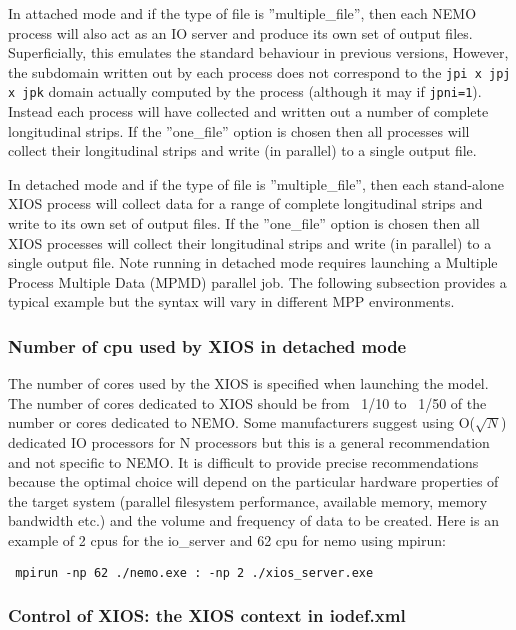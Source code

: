 \documentclass[NEMO_book]{subfiles}
\begin{document}
In attached mode and if the type of file is ''multiple\_file'', then each NEMO process will also act as an IO server and produce its own set of output files. Superficially, this emulates the standard behaviour in previous versions, However, the subdomain written out by each process does not correspond to the {\tt jpi x jpj x jpk} domain actually computed by the process (although it may if {\tt jpni=1}). Instead each process will have collected and written out a number of complete longitudinal strips. If the ''one\_file'' option is chosen then all processes will collect their longitudinal strips and write (in parallel) to a single output file. 

In detached mode and if the type of file is ''multiple\_file'', then each stand-alone XIOS process will collect data for a range of complete longitudinal strips and write to its own set of output files. If the ''one\_file'' option is chosen then all XIOS processes will collect their longitudinal strips and write (in parallel) to a single output file. Note running in detached mode requires launching a Multiple Process Multiple Data (MPMD) parallel job. The following subsection provides a typical example but the syntax will vary in different MPP environments.

\subsubsection{Number of cpu used by XIOS in detached mode}

The number of cores used by the XIOS is specified when launching the model. The number of cores dedicated to XIOS should be from ~1/10 to ~1/50 of the number or cores dedicated to NEMO. Some manufacturers suggest using O($\sqrt{N}$) dedicated IO processors for N processors but this is a general recommendation and not specific to NEMO. It is difficult to provide precise recommendations because the optimal choice will depend on the particular hardware properties of the target system (parallel filesystem performance, available memory, memory bandwidth etc.) and the volume and frequency of data to be created. Here is an example of 2 cpus for the io\_server and 62 cpu for nemo using mpirun:

\texttt{ mpirun -np 62 ./nemo.exe : -np 2 ./xios\_server.exe }

\subsubsection{Control of XIOS: the XIOS context in iodef.xml}
\end{document}
